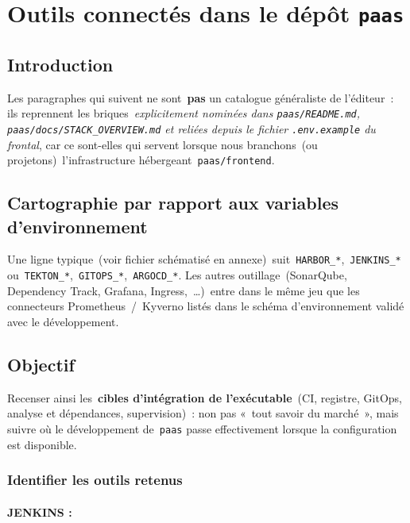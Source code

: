 \chapter{Outils connectés dans le dépôt \texttt{paas}}
\label{ch:outils}

\section{Introduction}

Les paragraphes qui suivent ne sont~\textbf{pas} un catalogue généraliste de l'éditeur~: ils reprennent les briques~\emph{explicitement nominées dans \texttt{paas/README.md}, \texttt{paas/docs/STACK\_OVERVIEW.md} et reliées depuis le fichier \texttt{.env.example} du frontal}, car ce sont-elles qui servent lorsque nous branchons~(ou projetons)~l'infrastructure hébergeant~\texttt{paas/frontend}.

\section{Cartographie par rapport aux variables d'environnement}

Une ligne typique~(voir fichier schématisé en annexe)~suit~\texttt{HARBOR\_*},~\texttt{JENKINS\_*} ou~\texttt{TEKTON\_*},~\texttt{GITOPS\_*},~\texttt{ARGOCD\_*}. Les autres outillage~(SonarQube, Dependency Track, Grafana, Ingress,~\dots)~entre dans le même jeu que les connecteurs Prometheus~/~Kyverno listés dans le schéma d'environnement validé avec le développement.

\section{Objectif}

Recenser ainsi les~\textbf{cibles d'intégration de l'exécutable}~(CI, registre, GitOps, analyse et dépendances, supervision)~: non pas «~tout savoir du marché~», mais suivre où le développement de~\texttt{paas} passe effectivement lorsque la configuration est disponible.

\subsection{Identifier les outils retenus}

\subsubsection{JENKINS :}

